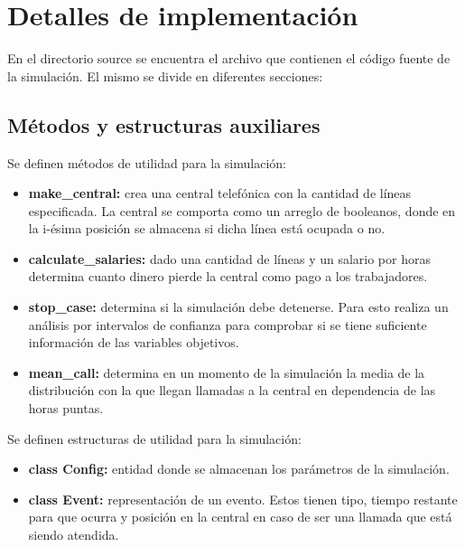\documentclass{article}
\begin{document}
	\section*{Detalles de implementación}
	En el directorio source se encuentra el archivo que contienen el código fuente de la simulación. El mismo se divide en diferentes secciones:
	
	\subsection*{Métodos y estructuras auxiliares}
	Se definen métodos de utilidad para la simulación:
	\begin{itemize}[left=2em]
		\item \textbf{make\_central:} crea una central telefónica con la cantidad de líneas especificada. La central se comporta como un arreglo de booleanos, donde en la i-ésima posición se almacena si dicha línea está ocupada o no.
		\item \textbf{calculate\_salaries:} dado una cantidad de líneas y un salario por horas determina cuanto dinero pierde la central como pago a los trabajadores.
		\item \textbf{stop\_case:} determina si la simulación debe detenerse. Para esto realiza un análisis por intervalos de confianza para comprobar si se tiene suficiente información de las variables objetivos.
		\item \textbf{mean\_call:} determina en un momento de la simulación la media de la distribución con la que llegan llamadas a la central en dependencia de las horas puntas.
	\end{itemize}
	
	Se definen estructuras de utilidad para la simulación:
	\begin{itemize}[left=2em]
		\item \textbf{class Config:}  entidad donde se almacenan los parámetros de la simulación.
		\item \textbf{class Event:} representación de un evento. Estos tienen tipo, tiempo restante para que ocurra y posición en la central en caso de ser una llamada que está siendo atendida.
	\end{itemize}
	
\end{document}
